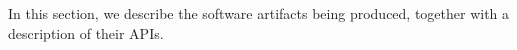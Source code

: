 In this section, we describe the software artifacts being produced, together with a description of their APIs. 


































